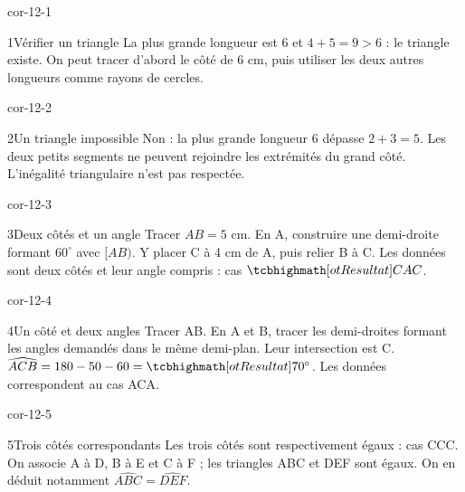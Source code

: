 \clearpage\pagestyle{otMain}\setlength{\otBlocEspacement}{2.5mm}\fontsize{11}{15}\selectfont{}
\begin{blocLivre}{cor-12-1}\begin{corrige}{1}{Vérifier un triangle}
La plus grande longueur est 6 et $4+5=9>6$ : le triangle existe. On peut tracer d’abord le côté de 6 cm, puis utiliser les deux autres longueurs comme rayons de cercles.
\label{fig-cor-12-1}
\end{corrige}\end{blocLivre}
\begin{blocLivre}{cor-12-2}\begin{corrige}{2}{Un triangle impossible}
Non : la plus grande longueur 6 dépasse $2+3=5$. Les deux petits segments ne peuvent rejoindre les extrémités du grand côté. L’inégalité triangulaire n’est pas respectée.
\label{fig-cor-12-2}
\end{corrige}\end{blocLivre}
\begin{blocLivre}{cor-12-3}\begin{corrige}{3}{Deux côtés et un angle}
Tracer $AB=5$ cm. En A, construire une demi-droite formant $60^\circ$ avec $[AB)$. Y placer C à 4 cm de A, puis relier B à C. Les données sont deux côtés et leur angle compris : cas $\res{CAC}$.
\label{fig-cor-12-3}
\end{corrige}\end{blocLivre}
\begin{blocLivre}{cor-12-4}\begin{corrige}{4}{Un côté et deux angles}
Tracer AB. En A et B, tracer les demi-droites formant les angles demandés dans le même demi-plan. Leur intersection est C. $\widehat{ACB}=180-50-60=\res{70^\circ}$. Les données correspondent au cas ACA.
\label{fig-cor-12-4}
\end{corrige}\end{blocLivre}
\begin{blocLivre}{cor-12-5}\begin{corrige}{5}{Trois côtés correspondants}
Les trois côtés sont respectivement égaux : cas CCC. On associe A à D, B à E et C à F ; les triangles ABC et DEF sont égaux. On en déduit notamment $\widehat{ABC}=\widehat{DEF}$.
\label{fig-cor-12-5}
\end{corrige}\end{blocLivre}
